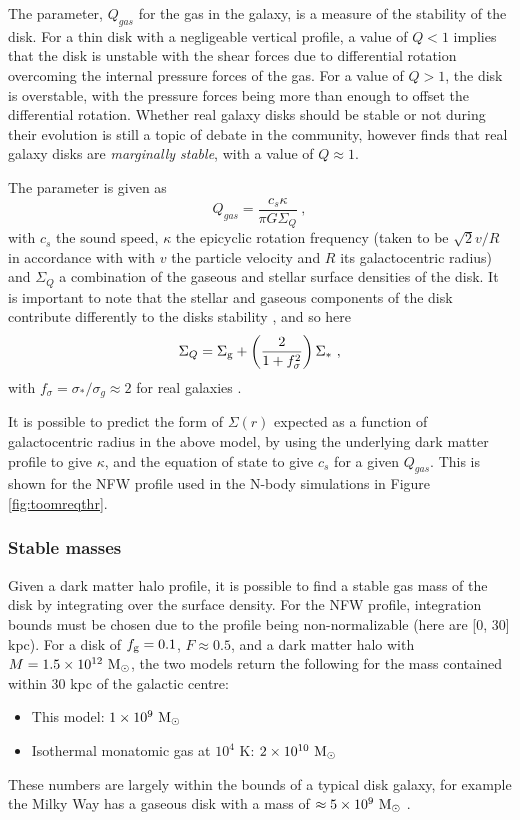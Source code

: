 The \citet{toomre_gravitational_1964} parameter, $Q_{gas}$ for the gas in the galaxy, is a measure of the stability of the disk.
For a thin disk with a negligeable vertical profile, a value of $Q<1$ implies that the disk is unstable with the shear forces due to differential rotation overcoming the internal pressure forces of the gas.
For a value of $Q>1$, the disk is overstable, with the pressure forces being more than enough to offset the differential rotation.
Whether real galaxy disks should be stable or not during their evolution is still a topic of debate in the community, however \citet{hopkins_stellar_2012} finds that real galaxy disks are \emph{marginally stable}, with a value of $Q \approx 1$.

The \citet{toomre_gravitational_1964} parameter is given as
\begin{equation}
    Q_{gas} = \frac{c_s \kappa}{\pi G \Sigma_Q}~,
    \label{eqn:Q}
\end{equation}
with $c_s$ the sound speed, $\kappa$ the epicyclic rotation frequency (taken to be $\sqrt{2} v/R$ in accordance with \citet{livermore_resolved_2015} with $v$ the particle velocity and $R$ its galactocentric radius) and $\Sigma_Q$ a combination of the gaseous and stellar surface densities of the disk.
It is important to note that the stellar and gaseous components of the disk contribute differently to the disks stability \citep{rafikov_local_2001}, and so here
\begin{equation}
    \Sigma_Q = \Sigma_\mathrm{g}  + \left(\frac{2}{1 + f_\sigma^2}\right)\Sigma_*~,
    \label{eqn:sgq}
\end{equation}
with $f_\sigma = \sigma_*/\sigma_g \approx 2$ for real galaxies \citep{korchagin_local_2003}.

It is possible to predict the form of $\Sigma(r)$ expected as a function of galactocentric radius in the above model, by using the underlying dark matter profile to give $\kappa$, and the equation of state to give $c_s$ for a given $Q_{gas}$.
This is shown for the NFW profile used in the N-body simulations in Figure \ref{fig:toomreqthr}.

\subsubsection{Stable masses}

Given a dark matter halo profile, it is possible to find a stable gas mass of the disk by integrating over the surface density.
For the NFW profile, integration bounds must be chosen due to the profile being non-normalizable (here are [0, 30] kpc).
For a disk of $f_\mathrm{g}=0.1$, $F \approx 0.5$, and a dark matter halo with $M = 1.5\times10^{12} ~\mathrm{M}_{\odot}$, the two models return the following for the mass contained within 30 kpc of the galactic centre:
\begin{itemize}
    \item This model: $1 \times 10^9 ~\mathrm{M}_{\odot}$
    \item Isothermal monatomic gas at $10^4$ K: $2 \times 10^{10}~\mathrm{M}_{\odot}$
\end{itemize}
These numbers are largely within the bounds of a typical disk galaxy, for example the Milky Way has a gaseous disk with a mass of $\approx 5\times10^9 ~\mathrm{M}_{\odot}$ \citep{licquia_improved_2013}.

